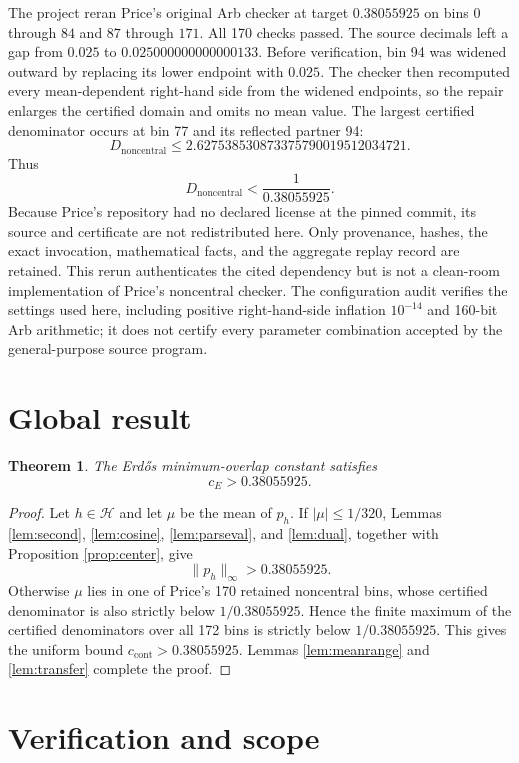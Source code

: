 \documentclass[11pt]{article}
\newtheorem{theorem}{Theorem}
\begin{document}
The project reran Price's original Arb checker at target \(0.38055925\) on
bins \(0\) through \(84\) and \(87\) through \(171\). All 170 checks passed.
The source decimals left a gap from \(0.025\) to
\(0.025000000000000133\). Before verification, bin 94 was widened outward by
replacing its lower endpoint with \(0.025\). The checker then recomputed every
mean-dependent right-hand side from the widened endpoints, so the repair
enlarges the certified domain and omits no mean value. The largest certified
denominator occurs at bin 77 and its reflected partner 94:
\[
  D_{\mathrm{noncentral}}
  \le2.627538530873375790019512034721.
\]
Thus
\[
  D_{\mathrm{noncentral}}
  <\frac1{0.38055925}.
\]
Because Price's repository had no declared license at the pinned commit, its
source and certificate are not redistributed here. Only provenance, hashes,
the exact invocation, mathematical facts, and the aggregate replay record are
retained. This rerun authenticates the cited dependency but is not a
clean-room implementation of Price's noncentral checker. The configuration
audit verifies the settings used here, including positive right-hand-side
inflation \(10^{-14}\) and 160-bit Arb arithmetic; it does not certify every
parameter combination accepted by the general-purpose source program.

\section{Global result}

\begin{theorem}\label{thm:main}
The Erd\H{o}s minimum-overlap constant satisfies
\[
  \boxed{c_E>0.38055925}.
\]
\end{theorem}

\begin{proof}
Let $h\in\mathcal H$ and let $\mu$ be the mean of $p_h$. If
$|\mu|\le1/320$, Lemmas \ref{lem:second}, \ref{lem:cosine},
\ref{lem:parseval}, and \ref{lem:dual}, together with
Proposition \ref{prop:center}, give
\[
  \|p_h\|_\infty>0.38055925.
\]
Otherwise $\mu$ lies in one of Price's 170 retained noncentral bins, whose
certified denominator is also strictly below $1/0.38055925$. Hence
the finite maximum of the certified denominators over all 172 bins is strictly
below $1/0.38055925$. This gives the uniform bound
$c_{\mathrm{cont}}>0.38055925$. Lemmas \ref{lem:meanrange} and
\ref{lem:transfer} complete the proof.
\end{proof}

\section{Verification and scope}
\end{document}
